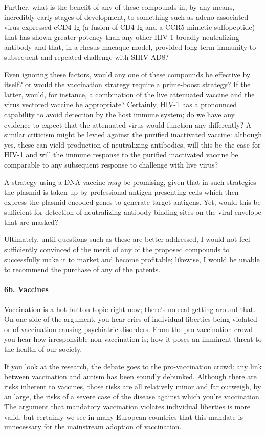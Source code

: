 \documentclass[11pt,letterpaper,final] {article}
\begin{document}
Further, what is the benefit of any of these compounds in, by any means, incredibly early stages of development, to something such as adeno-associated virus-expressed eCD4-Ig (a fusion of CD4-Ig and a CCR5-mimetic sulfopeptide) that has shown greater potency than any other HIV-1 broadly neutralizing antibody and that, in a rhesus macaque model, provided long-term immunity to subsequent and repeated challenge with SHIV-AD8?

Even ignoring these factors, would any one of these compounds be effective by itself? or would the vaccination strategy require a prime-boost strategy? If the latter, would, for instance, a combination of the live attenuated vaccine and the virus vectored vaccine be appropriate? Certainly, HIV-1 has a pronounced capability to avoid detection by the host immune system; do we have any evidence to expect that the attenuated virus would function any differently? A similar criticism might be levied against the purified inactivated vaccine: although yes, these can yield production of neutralizing antibodies, will this be the case for HIV-1 and will the immune response to the purified inactivated vaccine be comparable to any subsequent response to challenge with live virus?

A strategy using a DNA vaccine \textit{may} be promising, given that in such strategies the plasmid is taken up by professional antigen-presenting cells which then express the plasmid-encoded genes to generate target antigens. Yet, would this be sufficient for detection of neutralizing antibody-binding sites on the viral envelope that are masked?

Ultimately, until questions such as these are better addressed, I would not feel sufficiently convinced of the merit of any of the proposed compounds to successfully make it to market and become profitable; likewise, I would be unable to recommend the purchase of any of the patents.

\paragraph{6b. Vaccines} Vaccination is a hot-button topic right now; there's no real getting around that. On one side of the argument, you hear cries of individual liberties being violated or of vaccination causing psychiatric disorders. From the pro-vaccination crowd you hear how irresponsible non-vaccination is; how it poses an imminent threat to the health of our society.

If you look at the research, the debate goes to the pro-vaccination crowd: any link between vaccination and autism has been soundly debunked. Although there are risks inherent to vaccines, those risks are all relatively minor and far outweigh, by an large, the risks of a severe case of the disease against which you're vaccination. The argument that mandatory vaccination violates individual liberties is more valid, but certainly we see in many European countries that this mandate is unnecessary for the mainstream adoption of vaccination.
\end{document}
